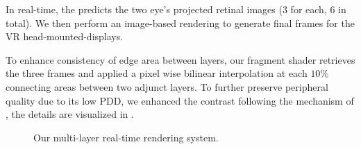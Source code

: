 In real-time, the \netName predicts the two eye's projected retinal images (3 for each, 6 in total).
We then perform an image-based rendering to generate final frames for the VR head-mounted-displays.

To enhance consistency of edge area between layers, our fragment shader retrieves the three frames and applied a pixel wise bilinear interpolation at each $10\%$ connecting areas between two adjunct layers. To further preserve peripheral quality due to its low PDD, we enhanced the contrast following the mechanism of \cite{Patney:2016:TFR}, the details are visualized in .

\begin{figure}
    \centering

    \caption{Our multi-layer real-time rendering system.}
    \label{fig:method:blending}
\end{figure}

